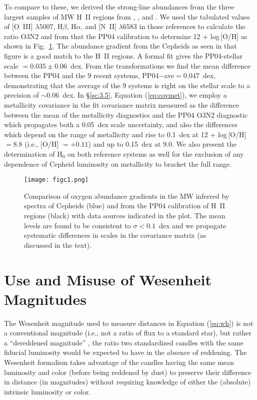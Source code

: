 \documentclass[12pt]{aastex631}
\begin{document}
\begin{appendices}
To compare to these, we derived the strong-line abundances from the three largest samples of MW H~II regions from \citet{Esteban:2017}, \citet{Esteban:2018}, and \citet{Arellano:2021}.  We used the tabulated values of [O~III] $\lambda5007$, H$\beta$, H$\alpha$, and [N~II] $\lambda6583$ in those references to calculate the ratio O3N2 and from that the PP04 calibration to determine 12 + log\,[O/H] as shown in Fig.~\ref{fg:mwabund}. The abundance gradient from the Cepheids as seen in that figure is a good match to the H~II regions.  A formal fit gives the PP04-stellar scale $=0.035\pm 0.06$~dex.  From the \citet{Teimoorinia:2021} transformations we find the mean difference between the PP04 and the 9 recent systems, PP04$-$ave$=0.047$~dex, demonstrating that the average of the 9 systems is right on the stellar scale to a precision of $\sim 0.06$~dex.  In \S\ref{sc:3.5}, Equation (\ref{eq:covmet}), we employ a metallicity covariance in the fit covariance matrix measured as the difference between the mean of the metallicity diagnostics and the PP04 O3N2 diagnostic which propagates both a 0.05~dex scale uncertainty, and also the differences which depend on the range of metallicity and rise to 0.1~dex at 12 + log\,[O/H] $=8.8$ (i.e., [O/H] $=+0.11$) and up to 0.15~dex at 9.0.  We also present the determination of H$_0$ on both reference systems as well for the exclusion of any dependence of Cepheid luminosity on metallicity to bracket the full range. 

\begin{figure}[t]   
\begin{center}
\texttt{[image: figc1.png]}
\end{center}
\caption{\label{fg:mwabund} Comparison of oxygen abundance gradients in the MW inferred by spectra of Cepheids (blue) and from the PP04 calibration of H~II regions (black) with data sources indicated in the plot.  The mean levels are found to be consistent to $\sigma < 0.1$~dex and we propagate systematic differences in scales in the covariance matrix (as discussed in the text). }
\end{figure}

\section{Use and Misuse of Wesenheit Magnitudes\label{sc:appd}}

The Wesenheit magnitude used to measure distances in Equation (\ref{eq:wh}) is not a conventional magnitude (i.e., not a ratio of flux to a standard star), but rather a ``dereddened magnitude'' \citep[see Appendix C of][for a review]{madore91}, the ratio two standardized candles with the same fiducial luminosity would be expected to have in the absence of reddening.  The Wesenheit formalism takes advantage of the candles having the same mean luminosity and color (before being reddened by dust) to preserve their difference in distance (in magnitudes) without requiring knowledge of either the (absolute) intrinsic luminosity or color. 


\end{appendices}
\end{document}
